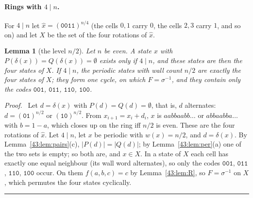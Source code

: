 \documentclass[10pt,a4paper]{article}
\newtheorem{lemma}[theorem]{Lemma}
\newcommand{\qedmark}{\rule{1.1ex}{1.1ex}}
\newenvironment{proof}[1][Proof]{\par\smallskip\noindent\textit{#1.}\ }{\hfill\qedmark\par\smallskip}
\newcommand{\code}[1]{\mathtt{#1}}            %
\begin{document}
\paragraph{Rings with $4\mid n$.}
For $4\mid n$ let $\hat x=(\code{0011})^{n/4}$ (the cells $0,1$ carry $0$, the cells $2,3$ carry $1$, and so on)
and let $X$ be the set of the four rotations of $\hat x$.

\begin{lemma}[the level $n/2$]\label{43:lem:half}
Let $n$ be even. A state $x$ with $P(\delta(x))=Q(\delta(x))=\emptyset$ exists only if $4\mid n$, and these
states are then the four states of $X$. If $4\mid n$, the periodic states with wall count $n/2$ are exactly the
four states of $X$; they form one cycle, on which $F=\sigma^{-1}$, and they contain only the codes
$\code{001}$, $\code{011}$, $\code{110}$, $\code{100}$.
\end{lemma}
\begin{proof}
Let $d=\delta(x)$ with $P(d)=Q(d)=\emptyset$, that is, $d$ alternates: $d=(\code{01})^{n/2}$ or
$(\code{10})^{n/2}$. From $x_{i+1}=x_i+d_i$, $x$ is $aabbaabb\ldots$ or $abbaabba\ldots$ with $b=1-a$, which
closes up on the ring iff $n/2$ is even. These are the four rotations of $\hat x$.
Let $4\mid n$, let $x$ be periodic with $w(x)=n/2$, and $d=\delta(x)$. By Lemma~\ref{43:lem:pairs}(c),
$|P(d)|=|Q(d)|$; by Lemma~\ref{43:lem:per}(a) one of the two sets is empty; so both are, and $x\in X$.
In a state of $X$ each cell has exactly one equal neighbour (its wall word alternates), so only the codes
$\code{001}$, $\code{011}$, $\code{110}$, $\code{100}$ occur. On them $f(a,b,c)=c$ by Lemma~\ref{43:lem:R}, so $F=\sigma^{-1}$ on $X$, which
permutes the four states cyclically.
\end{proof}
\end{document}
